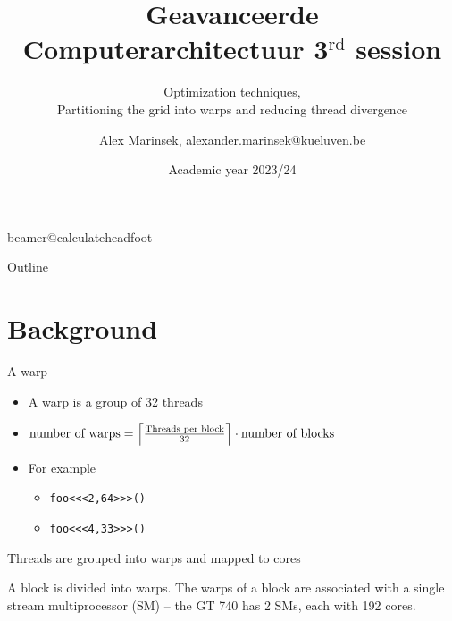 \documentclass[11pt,t]{beamer}
\title[Geavanceerde Computerarchitectuur 3$^{\text{rd}}$ session]{Geavanceerde Computerarchitectuur 3$^{\text{rd}}$ session} %
\subtitle{Optimization techniques, \\ Partitioning the grid into warps and reducing thread divergence}
\author{Alex Marinsek, {\footnotesize alexander.marinsek@kueluven.be}}
\institute{DRAMCO -- WaveCore -- ESAT}
\date{Academic year 2023/24}
\newcommand{\inline}[1]{ \colorbox{mygray}{\lstinline{#1}}}
\DeclarePairedDelimiter\ceil{\lceil}{\rceil}
\begin{document}
\csname beamer@calculateheadfoot\endcsname %


\begin{frame}
	\titlepage
\end{frame}
	

\begin{frame}{Outline}
	\hfill	{\large \parbox{.961\textwidth}{\tableofcontents[hideothersubsections]}}
\end{frame}




\section{Background}


\begin{frame}{A warp}
    \begin{itemize}\setlength\itemsep{1em}
        \item A warp is a group of 32 threads
        \item $\text{number of warps} = \ceil*{ \frac{\text{Threads per block}}{\text{32}}} \cdot \text{number of blocks}$
        \item For example
        \begin{itemize}\setlength\itemsep{0.5em}\vspace{1mm}
            \item \inline{foo<<<2,64>>>()} 
            \item \inline{foo<<<4,33>>>()} 
        \end{itemize}
    \end{itemize}
\end{frame}


\begin{frame}{Threads are grouped into warps and mapped to cores}
    \vspace{-2mm}
    
    \begin{figure}
        \centering
        \resizebox{0.9\textwidth}{!}{}
    \end{figure}

    A block is divided into warps. The warps of a block are associated with a single stream multiprocessor (SM) -- the GT 740 has 2 SMs, each with 192 cores.
    
\end{frame}
\end{document}
